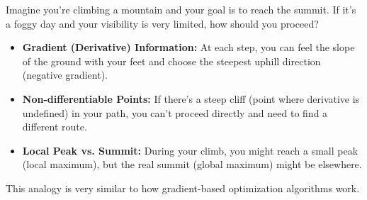\begin{tcolorbox}[title=Real-Life Example: Mountain Climbing]
Imagine you're climbing a mountain and your goal is to reach the summit. If it's a foggy day and your visibility is very limited, how should you proceed?

\begin{itemize}
    \item \textbf{Gradient (Derivative) Information:} At each step, you can feel the slope of the ground with your feet and choose the steepest uphill direction (negative gradient).
    \item \textbf{Non-differentiable Points:} If there's a steep cliff (point where derivative is undefined) in your path, you can't proceed directly and need to find a different route.
    \item \textbf{Local Peak vs. Summit:} During your climb, you might reach a small peak (local maximum), but the real summit (global maximum) might be elsewhere.
\end{itemize}

This analogy is very similar to how gradient-based optimization algorithms work.
\end{tcolorbox}

